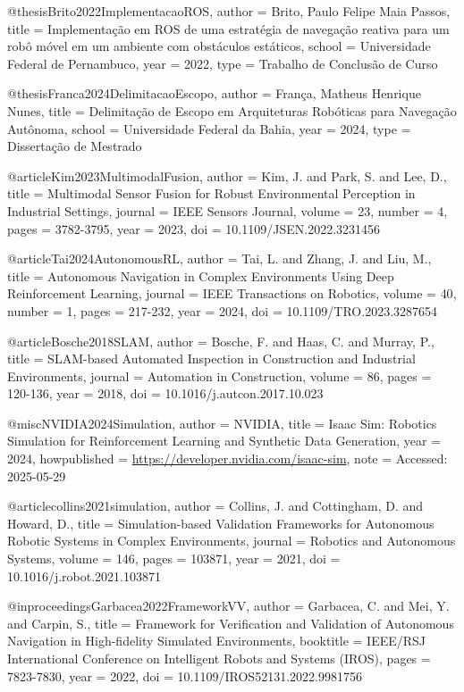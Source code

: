 @thesis{Brito2022ImplementacaoROS,
  author = {Brito, Paulo Felipe Maia Passos},
  title = {Implementação em ROS de uma estratégia de navegação reativa para um robô móvel em um ambiente com obstáculos estáticos},
  school = {Universidade Federal de Pernambuco},
  year = {2022},
  type = {Trabalho de Conclusão de Curso}
}

@thesis{Franca2024DelimitacaoEscopo,
  author = {França, Matheus Henrique Nunes},
  title = {Delimitação de Escopo em Arquiteturas Robóticas para Navegação Autônoma},
  school = {Universidade Federal da Bahia},
  year = {2024},
  type = {Dissertação de Mestrado}
}

@article{Kim2023MultimodalFusion,
  author = {Kim, J. and Park, S. and Lee, D.},
  title = {Multimodal Sensor Fusion for Robust Environmental Perception in Industrial Settings},
  journal = {IEEE Sensors Journal},
  volume = {23},
  number = {4},
  pages = {3782-3795},
  year = {2023},
  doi = {10.1109/JSEN.2022.3231456}
}

@article{Tai2024AutonomousRL,
  author = {Tai, L. and Zhang, J. and Liu, M.},
  title = {Autonomous Navigation in Complex Environments Using Deep Reinforcement Learning},
  journal = {IEEE Transactions on Robotics},
  volume = {40},
  number = {1},
  pages = {217-232},
  year = {2024},
  doi = {10.1109/TRO.2023.3287654}
}

@article{Bosche2018SLAM,
  author = {Bosche, F. and Haas, C. and Murray, P.},
  title = {SLAM-based Automated Inspection in Construction and Industrial Environments},
  journal = {Automation in Construction},
  volume = {86},
  pages = {120-136},
  year = {2018},
  doi = {10.1016/j.autcon.2017.10.023}
}

@misc{NVIDIA2024Simulation,
  author = {NVIDIA},
  title = {Isaac Sim: Robotics Simulation for Reinforcement Learning and Synthetic Data Generation},
  year = {2024},
  howpublished = {\url{https://developer.nvidia.com/isaac-sim}},
  note = {Accessed: 2025-05-29}
}

@article{collins2021simulation,
  author = {Collins, J. and Cottingham, D. and Howard, D.},
  title = {Simulation-based Validation Frameworks for Autonomous Robotic Systems in Complex Environments},
  journal = {Robotics and Autonomous Systems},
  volume = {146},
  pages = {103871},
  year = {2021},
  doi = {10.1016/j.robot.2021.103871}
}

@inproceedings{Garbacea2022FrameworkVV,
  author = {Garbacea, C. and Mei, Y. and Carpin, S.},
  title = {Framework for Verification and Validation of Autonomous Navigation in High-fidelity Simulated Environments},
  booktitle = {IEEE/RSJ International Conference on Intelligent Robots and Systems (IROS)},
  pages = {7823-7830},
  year = {2022},
  doi = {10.1109/IROS52131.2022.9981756}
}

